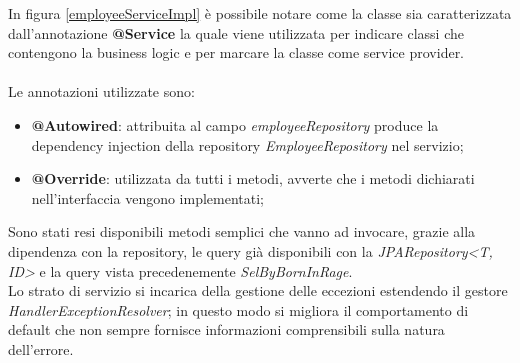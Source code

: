 \FloatBarrier
In figura \ref{employeeServiceImpl} è possibile notare come la classe sia caratterizzata dall'annotazione \textbf{@Service} la quale viene utilizzata per indicare classi che contengono la business logic e per marcare la classe come service provider.\\\\
Le annotazioni utilizzate sono:
\begin{itemize}
  \item \textbf{@Autowired}: attribuita al campo \textit{employeeRepository} produce la dependency injection della repository \textit{EmployeeRepository} nel servizio;
  \item \textbf{@Override}: utilizzata da tutti i metodi, avverte che i metodi dichiarati nell'interfaccia vengono implementati;
\end{itemize}
Sono stati resi disponibili metodi semplici che vanno ad invocare, grazie alla dipendenza con la repository, le query già disponibili con la \textit{JPARepository<T, ID>} e la query vista precedenemente \textit{SelByBornInRage}.\\
Lo strato di servizio si incarica della gestione delle eccezioni estendendo il gestore  \textit{HandlerExceptionResolver}; in questo modo si migliora il comportamento di default che non sempre fornisce informazioni comprensibili sulla natura dell'errore.
